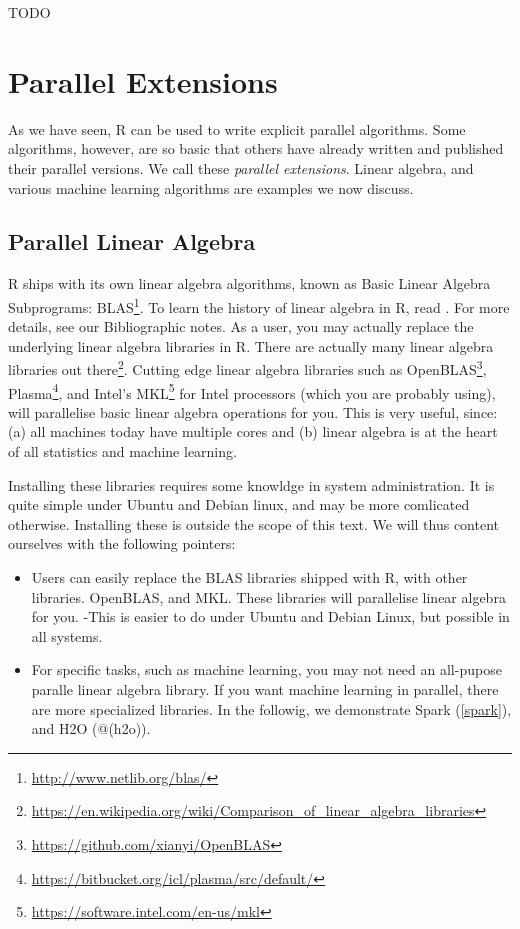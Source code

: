 \documentclass[]{book}
\providecommand{\tightlist}{%
  \setlength{\itemsep}{0pt}\setlength{\parskip}{0pt}}
\renewcommand{\href}[2]{#2\footnote{\url{#1}}}
\theoremstyle{definition}
\theoremstyle{definition}
\theoremstyle{definition}
\theoremstyle{remark}
\begin{document}
TODO

\hypertarget{parallel-extensions}{%
\section{Parallel Extensions}\label{parallel-extensions}}

As we have seen, R can be used to write explicit parallel algorithms.
Some algorithms, however, are so basic that others have already written and published their parallel versions.
We call these \emph{parallel extensions}.
Linear algebra, and various machine learning algorithms are examples we now discuss.

\hypertarget{parallel-linear-algebra}{%
\subsection{Parallel Linear Algebra}\label{parallel-linear-algebra}}

R ships with its own linear algebra algorithms, known as Basic Linear Algebra Subprograms: \href{http://www.netlib.org/blas/}{BLAS}.
To learn the history of linear algebra in R, read \citet{maechler20062nd}.
For more details, see our Bibliographic notes.
As a user, you may actually replace the underlying linear algebra libraries in R.
There are actually many linear algebra libraries \href{https://en.wikipedia.org/wiki/Comparison_of_linear_algebra_libraries}{out there}.
Cutting edge linear algebra libraries such as \href{https://github.com/xianyi/OpenBLAS}{OpenBLAS}, \href{https://bitbucket.org/icl/plasma/src/default/}{Plasma}, and Intel's \href{https://software.intel.com/en-us/mkl}{MKL} for Intel processors (which you are probably using), will parallelise basic linear algebra operations for you.
This is very useful, since: (a) all machines today have multiple cores and (b) linear algebra is at the heart of all statistics and machine learning.

Installing these libraries requires some knowldge in system administration.
It is quite simple under Ubuntu and Debian linux, and may be more comlicated otherwise.
Installing these is outside the scope of this text.
We will thus content ourselves with the following pointers:

\begin{itemize}
\tightlist
\item
  Users can easily replace the BLAS libraries shipped with R, with other libraries. OpenBLAS, and MKL. These libraries will parallelise linear algebra for you.
  -This is easier to do under Ubuntu and Debian Linux, but possible in all systems.
\item
  For specific tasks, such as machine learning, you may not need an all-pupose paralle linear algebra library. If you want machine learning in parallel, there are more specialized libraries. In the followig, we demonstrate Spark (\ref{spark}), and H2O (@(h2o)).
\end{itemize}
\end{document}
